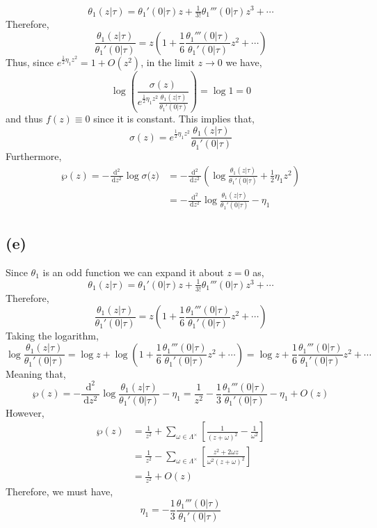 \documentclass[12pt]{extarticle}
\renewcommand{\d}[1]{\: \mathrm{d}#1 \:}
\newcommand{\dn}[2]{\: \mathrm{d}^{#1} #2 \:}
\newcommand{\nderiv}[3]{\frac{\dn{#1}{#2}}{\d{#3^2}}}
\theoremstyle{definition}
\begin{document}
\[ \theta_1(z | \tau) = \theta_1'(0 | \tau) z + \tfrac{1}{3!} \theta_1'''(0 | \tau) z^3 + \cdots \]
Therefore,
\[ \frac{\theta_1(z | \tau)}{\theta_1'(0 | \tau)} = z \left( 1 + \frac{1}{6} \frac{\theta_1'''(0 | \tau)}{\theta_1'(0 | \tau)} z^2 + \cdots \right) \]
Thus, since $e^{\frac{1}{2} \eta_1 z^2} = 1 + O(z^2)$, in the limit $z \to 0$ we have,
\[\log{\left( \frac{\sigma(z)}{e^{\frac{1}{2} \eta_1 z^2} \frac{\theta_1(z | \tau)}{\theta_1'(0 |\tau)}} \right)} = \log{1} = 0 \]
and thus $f(z) \equiv 0$ since it is constant. This implies that,
\[ \sigma(z) = e^{\frac{1}{2} \eta_1 z^2} \frac{\theta_1(z | \tau)}{\theta_1'(0 |\tau)} \]
Furthermore,
\begin{align*}
\wp(z) = - \nderiv{2}{}{z} \log{\sigma(z}) & = - \nderiv{2}{}{z} \left( \log{\frac{\theta_1(z | \tau)}{\theta_1'(0 | \tau)}} + \frac{1}{2} \eta_1 z^2 \right)
\\
& = - \nderiv{2}{}{z} \log{\frac{\theta_1(z | \tau)}{\theta_1'(0 | \tau)}} - \eta_1
\end{align*}


\subsection*{(e)}

Since $\theta_1$ is an odd function we can expand it about $z = 0$ as,
\[ \theta_1(z | \tau) = \theta_1'(0 | \tau) z + \tfrac{1}{3!} \theta_1'''(0 | \tau) z^3 + \cdots \]
Therefore,
\[ \frac{\theta_1(z | \tau)}{\theta_1'(0 | \tau)} = z \left( 1 + \frac{1}{6} \frac{\theta_1'''(0 | \tau)}{\theta_1'(0 | \tau)} z^2 + \cdots \right) \]
Taking the logarithm,
\[ \log{\frac{\theta_1(z | \tau)}{\theta_1'(0 | \tau)}} = \log{z} + \log{\left( 1 + \frac{1}{6} \frac{\theta_1'''(0 | \tau)}{\theta_1'(0 | \tau)} z^2 + \cdots \right)} = \log{z} + \frac{1}{6} \frac{\theta_1'''(0 | \tau)}{\theta_1'(0 | \tau)} z^2 + \cdots \] 
Meaning that,
\[ \wp(z) = - \nderiv{2}{}{z}  \log{\frac{\theta_1(z | \tau)}{\theta_1'(0 | \tau)}} - \eta_1 = \frac{1}{z^2} - \frac{1}{3} \frac{\theta_1'''(0 | \tau)}{\theta_1'(0 | \tau)} - \eta_1 + O(z) \]
However,  
\begin{align*}
\wp(z) & = \frac{1}{z^2} + \sum_{\omega \in \Lambda^\times} \left[ \frac{1}{(z + \omega)^2} - \frac{1}{\omega^2} \right]
\\
& = \frac{1}{z^2} - \sum_{\omega \in \Lambda^\times} \left[ \frac{z^2 + 2 \omega z}{\omega^2 (z + \omega)^2} \right]
\\
& = \frac{1}{z^2} + O(z)
\end{align*}
Therefore, we must have,
\[ \eta_1 = - \frac{1}{3} \frac{\theta_1'''(0 | \tau)}{\theta_1'(0 | \tau)} \]
\end{document}
